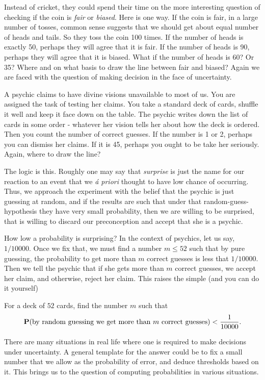 \documentclass[preprint,  11pt]{amsart}
\begin{document}
Instead of cricket, they could spend their time on the more interesting question of checking if the coin is {\em fair} or {\em biased}. Here is one way. If the coin is fair, in a large number of tosses, common sense suggests that we should get about equal number of heads and tails. So they  toss the coin 100 times. If the number of heads is exactly 50, perhaps they will agree that it is fair. If the number of heads is 90, perhaps they will agree that it is biased. What if the number of heads is 60? Or 35? Where and on what basis to draw the line between fair and biased? Again we are faced with the question of making decision in the face of uncertainty.
\eeg

\beg A psychic claims to have divine visions unavailable to most of us. You are assigned the task of testing her claims. You take a standard deck of cards, shuffle it well and keep it face down on the table. The psychic writes down the list of cards in some order - whatever her vision tells her about how the deck is ordered. Then you count the number of correct guesses. If the number is 1 or 2, perhaps you can dismiss her claims. If it is 45, perhaps you ought to be take her seriously. Again, where to draw the line?

The logic is this. Roughly one may say that {\em surprise} is just the name for our reaction to an event that we {\em \'{a} priori} thought to have low chance of occurring. Thus, we approach the experiment with the belief that the psychic is just guessing at random, and if the results are such that under that random-guess-hypothesis they have very small probability, then we are willing to be surprised, that is willing to discard our preconception and accept that she is a psychic.

How low a probability is surprising? In the context of psychics, let us say, $1/10000$. Once we fix that, we must find a number $m\le 52$ such that by pure guessing, the probability to get more than $m$ correct guesses is less that $1/10000$. Then we tell the psychic that if she gets more than $m$ correct guesses, we accept her claim, and otherwise, reject her claim.  This raises the simple (and you can do it yourself)
\begin{question} For a deck of $52$ cards, find the number $m$ such that
$$
\mathbf{P}(\mbox{by random guessing we get more than }m\mbox{ correct guesses})<\frac{1}{10000}.
$$
\end{question}
\eeg


 There are many situations in real life where one is required to make decisions under uncertainty. A general template for the answer could be to fix a small number that we allow as the probability of error, and deduce thresholds based on it. This brings us to the question of computing probabilities in various situations.
\end{document}
